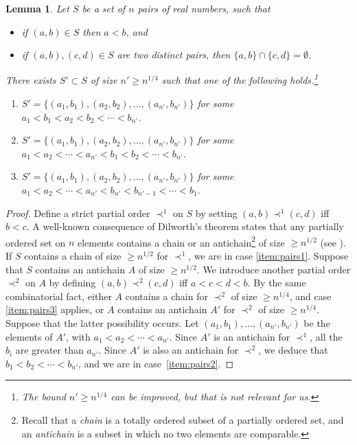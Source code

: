 \documentclass[11pt]{amsart}
\newtheorem{lemma}[theorem]{Lemma}
\theoremstyle{definition}
\renewcommand{\geq}{\geqslant}
\newcommand{\none}{n}
\newcommand{\ntwo}{n'}
\begin{document}
\begin{lemma}
\label{lem:combipairs}
Let $S$ be a set of $\none$ pairs of real numbers, such that
\begin{itemize}
	\item if $(a,b)\in S$ then $a<b$, and
	\item if  $(a,b), (c,d)\in S$ are two distinct pairs, then $\{a, b\}\cap \{c,d\} = \emptyset$.
\end{itemize}

There exists $S' \subset S$ of size $\ntwo \geq \none^{1/4}$ such that one of the following holds.\footnote{The bound $\ntwo \geq n^{1/4}$ can be improved, but that is not relevant for us.}
\begin{enumerate}[label=(\roman*), ref=\roman*]
	\item \label{item:pairs1} $S' = \{(a_1, b_1), (a_2, b_2),\ldots, (a_{\ntwo}, b_{\ntwo})\}$ for some $a_1<b_1<a_2<b_2<\cdots <b_{\ntwo}$.
	\item \label{item:pairs2} $S' = \{(a_1, b_1), (a_2, b_2),\ldots, (a_{\ntwo}, b_{\ntwo})\}$ for some $a_1<a_2<\cdots <a_{\ntwo}<b_1<b_2<\cdots <b_{\ntwo}$.
	\item \label{item:pairs3} $S' = \{(a_1, b_1), (a_2, b_2),\ldots, (a_{\ntwo}, b_{\ntwo})\}$ for some $a_1<a_2<\cdots <a_{\ntwo}<b_{\ntwo}<b_{\ntwo-1}<\cdots <b_1$.
\end{enumerate}
\end{lemma}
\begin{proof}
Define a strict partial order $\prec^1$ on $S$ by setting $(a,b) \prec^1 (c,d)$ iff $b<c$. A well-known consequence of Dilworth's theorem states that any partially ordered set on $\none$ elements contains a chain or an antichain\footnote{Recall that a \emph{chain} is a totally ordered subset of a partially ordered set, and an \emph{antichain} is a subset in which no two elements are comparable.} of size $\geq \none^{1/2}$ (see \cite[Proposition~2.5.9]{ordered}). If $S$ contains a chain of size $\geq \none^{1/2}$ for $\prec^1$, we are in case \cref{item:pairs1}. Suppose that $S$ contains an antichain $A$ of size $\geq \none^{1/2}$. We introduce another partial order $\prec^2$ on $A$ by defining $(a,b) \prec^2 (c,d)$ iff $a<c<d<b$. By the same combinatorial fact, either $A$ contains a chain for $\prec^2$ of size $\geq \none^{1/4}$, and case \cref{item:pairs3} applies, or $A$ contains an antichain $A'$ for $\prec^2$ of size $\geq \none^{1/4}$. Suppose that the latter possibility occurs. Let $(a_1, b_1), \ldots, (a_{\ntwo}, b_{\ntwo})$ be the elements of $A'$, with $a_1<a_2 <\cdots < a_{\ntwo}$. Since $A'$ is an antichain for $\prec^1$, all the $b_i$ are greater than $a_{\ntwo}$. Since $A'$ is also an antichain for $\prec^2$, we deduce that $b_1<b_2<\cdots <b_{\ntwo}$, and we are in case~\cref{item:pairs2}.
\end{proof}
\end{document}
